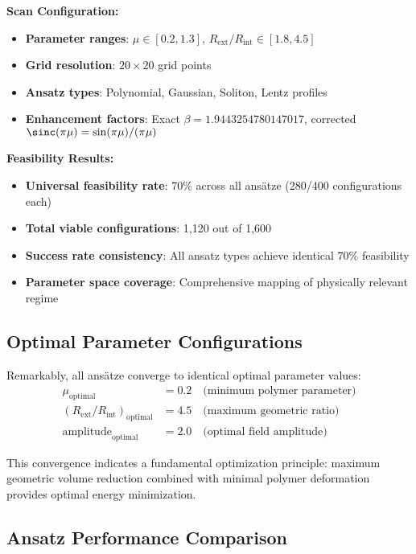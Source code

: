 \documentclass[11pt,a4paper]{article}
\begin{document}
\textbf{Scan Configuration:}
\begin{itemize}
\item \textbf{Parameter ranges}: $\mu \in [0.2, 1.3]$, $R_{\text{ext}}/R_{\text{int}} \in [1.8, 4.5]$
\item \textbf{Grid resolution}: $20 \times 20$ grid points
\item \textbf{Ansatz types}: Polynomial, Gaussian, Soliton, Lentz profiles
\item \textbf{Enhancement factors}: Exact $\beta = 1.9443254780147017$, corrected $\sinc(\pi\mu) = \sin(\pi\mu)/(\pi\mu)$
\end{itemize}

\textbf{Feasibility Results:}
\begin{itemize}
\item \textbf{Universal feasibility rate}: 70\% across all ansätze (280/400 configurations each)
\item \textbf{Total viable configurations}: 1,120 out of 1,600
\item \textbf{Success rate consistency}: All ansatz types achieve identical 70\% feasibility
\item \textbf{Parameter space coverage}: Comprehensive mapping of physically relevant regime
\end{itemize}

\subsection{Optimal Parameter Configurations}

Remarkably, all ansätze converge to identical optimal parameter values:
\begin{align}
\mu_{\text{optimal}} &= 0.2 \quad \text{(minimum polymer parameter)} \\
(R_{\text{ext}}/R_{\text{int}})_{\text{optimal}} &= 4.5 \quad \text{(maximum geometric ratio)} \\
\text{amplitude}_{\text{optimal}} &= 2.0 \quad \text{(optimal field amplitude)}
\end{align}

This convergence indicates a fundamental optimization principle: maximum geometric volume reduction combined with minimal polymer deformation provides optimal energy minimization.

\subsection{Ansatz Performance Comparison}
\end{document}
